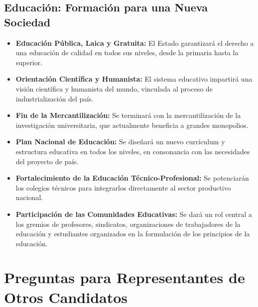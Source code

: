 \documentclass[a4paper, 11pt]{article}
\begin{document}
\subsection{Educación: Formación para una Nueva Sociedad}
\begin{itemize}
    \item \textbf{Educación Pública, Laica y Gratuita:} El Estado garantizará el derecho a una educación de calidad en todos sus niveles, desde la primaria hasta la superior.

    \item \textbf{Orientación Científica y Humanista:} El sistema educativo impartirá una visión científica y humanista del mundo, vinculada al proceso de industrialización del país.

    \item \textbf{Fin de la Mercantilización:} Se terminará con la mercantilización de la investigación universitaria, que actualmente beneficia a grandes monopolios.

    \item \textbf{Plan Nacional de Educación:} Se diseñará un nuevo currículum y estructura educativa en todos los niveles, en consonancia con las necesidades del proyecto de país.

    \item \textbf{Fortalecimiento de la Educación Técnico-Profesional:} Se potenciarán los colegios técnicos para integrarlos directamente al sector productivo nacional.

    \item \textbf{Participación de las Comunidades Educativas:} Se dará un rol central a los gremios de profesores, sindicatos, organizaciones de trabajadores de la educación y estudiantes organizados en la formulación de los principios de la educación.
\end{itemize}
\newpage

\section{Preguntas para Representantes de Otros Candidatos}

\end{document}
